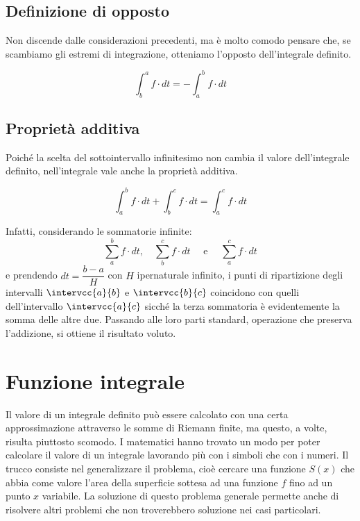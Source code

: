 \subsection{Definizione di opposto}
\label{subsec:integrali_opposto}

Non discende dalle considerazioni precedenti, ma è molto comodo pensare  
che, se scambiamo gli estremi di integrazione, otteniamo 
l'opposto dell'integrale definito.
\begin{newdef}{}{}
\[\int_b^a f \cdot dt = - \int_a^b f \cdot dt\]
\end{newdef}

\subsection{Proprietà additiva}
\label{subsec:integrali_proprieta_additiva}

Poiché la scelta del sottointervallo infinitesimo non cambia il valore 
dell'integrale definito, 
nell'integrale vale anche la proprietà additiva. 
\begin{newtheo}{}{}
\[\int_a^b f \cdot dt + \int_b^c f \cdot dt = \int_a^c f \cdot dt\] 
\end{newtheo}
Infatti, considerando le sommatorie infinite:
\[\sum_a^b f \cdot dt,\quad \sum_b^c f \cdot dt \quad\text{ e } \quad 
  \sum_a^c f \cdot dt\] 
e prendendo \(dt = \dfrac{b-a}{H}\) con \(H\) ipernaturale infinito, 
i punti di ripartizione degli intervalli \(\intervcc{a}{b}\) e 
\(\intervcc{b}{c}\) coincidono con quelli dell'intervallo \(\intervcc{a}{c}\) 
sicché la terza sommatoria è evidentemente la somma delle altre due.
Passando alle loro parti standard, operazione che preserva l'addizione, si 
ottiene il risultato voluto.

\section{Funzione integrale}
\label{sec:integrali_funzione_integrale}

Il valore di un integrale definito può essere calcolato con una certa 
approssimazione attraverso le somme di Riemann finite, ma questo, a volte, 
risulta piuttosto scomodo. I matematici hanno trovato un modo per poter 
calcolare il valore di un integrale lavorando più con i simboli che con i 
numeri. Il trucco consiste nel generalizzare il problema, cioè cercare una 
funzione \(S(x)\) che abbia come valore l'area della superficie sottesa ad 
una funzione \(f\) fino ad un punto \(x\) variabile. La soluzione di questo 
problema generale permette anche di risolvere altri problemi che non 
troverebbero soluzione nei casi particolari.

